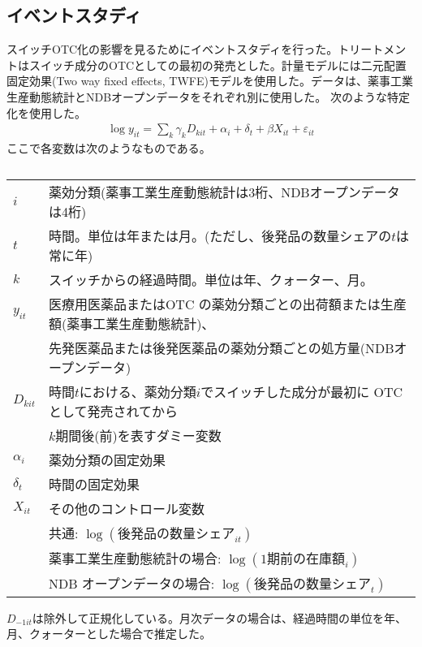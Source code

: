 \documentclass[a4paper,11pt,uplatex]{jsarticle}
\theoremstyle{definition}
\begin{document}
\subsection{イベントスタディ}
スイッチOTC化の影響を見るためにイベントスタディを行った。トリートメントはスイッチ成分のOTCとしての最初の発売とした。計量モデルには二元配置固定効果(Two way fixed effects, TWFE)モデルを使用した。データは、薬事工業生産動態統計とNDBオープンデータをそれぞれ別に使用した。
次のような特定化を使用した。
\begin{align*}
\log y_{it} =\sum_k \gamma_k D_{kit}+\alpha_i +\delta_t+\beta X_{it}+\varepsilon_{it}
\end{align*}
ここで各変数は次のようなものである。
\begin{table}[H] \caption{}
    \begin{tabular}{ll}
       \toprule 
       \(i\)&薬効分類(薬事工業生産動態統計は3桁、NDBオープンデータは4桁)\\
       \(t\)&時間。単位は年または月。(ただし、後発品の数量シェアの\(t\)は常に年)\\
       \(k\)&スイッチからの経過時間。単位は年、クォーター、月。\\
    $y_{it}$ & 医療用医薬品またはOTC の薬効分類ごとの出荷額または生産額(薬事工業生産動態統計)、\\
    & 先発医薬品または後発医薬品の薬効分類ごとの処方量(NDBオープンデータ)\\
    $D_{kit}$ & 時間\(t\)における、薬効分類\(i\)でスイッチした成分が最初に OTC として発売されてから\\
    & \(k\)期間後(前)を表すダミー変数\\
    $\alpha_i$ & 薬効分類の固定効果\\
    $\delta_t$ & 時間の固定効果\\
    $X_{it}$ & その他のコントロール変数\\
    & 共通: $\log(後発品の数量シェア_{it})$\\
    & 薬事工業生産動態統計の場合: $\log(1期前の在庫額_i)$\\
    & \textrm{NDB} オープンデータの場合: $\log(後発品の数量シェア_t)$ \\
    \bottomrule
    \end{tabular}
\end{table}
\(D_{-1it}\)は除外して正規化している。月次データの場合は、経過時間の単位を年、月、クォーターとした場合で推定した。
\end{document}
